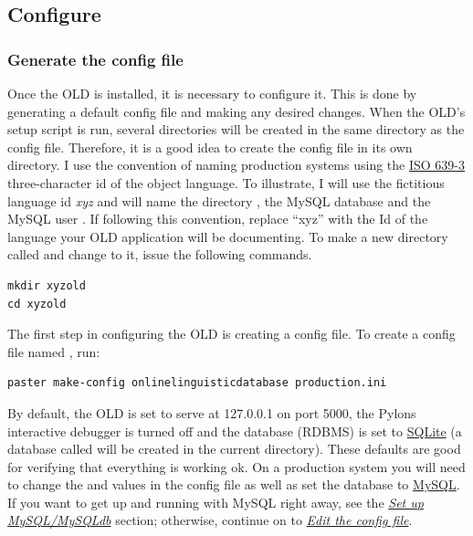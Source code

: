 \documentclass[letterpaper,10pt,english]{sphinxmanual}
\begin{document}
\subsection{Configure}
\label{installation:configure}

\subsubsection{Generate the config file}
\label{installation:generate-the-config-file}\label{installation:gen-config}
Once the OLD is installed, it is necessary to configure it.  This is done by
generating a default config file and making any desired changes.  When the OLD's
setup script is run, several directories will be created in the same directory
as the config file.  Therefore, it is a good idea to create the config file in
its own directory.  I use the convention of naming production systems using the
\href{http://www-01.sil.org/iso639-3/codes.asp}{ISO 639-3} three-character id of
the object language.  To illustrate, I will use the fictitious language id \emph{xyz}
and will name the directory , the MySQL database  and the
MySQL user .  If following this convention, replace ``xyz'' with the Id
of the language your OLD application will be documenting.  To make a new
directory called  and change to it, issue the following commands.

\begin{Verbatim}[commandchars=\\\{\}]
mkdir xyzold
cd xyzold
\end{Verbatim}

The first step in configuring the OLD is creating a config file.  To create a
config file named , run:

\begin{Verbatim}[commandchars=\\\{\}]
paster make-config onlinelinguisticdatabase production.ini
\end{Verbatim}

By default, the OLD is set to serve at 127.0.0.1 on port 5000, the Pylons
interactive debugger is turned off and the database (RDBMS) is set to
\href{http://www.sqlite.org/}{SQLite} (a database called  will be
created in the current directory). These defaults are good for verifying that
everything is working ok.  On a production system you will need to change the
 and  values in the config file as well as set the database to
\href{http://www.mysql.com/}{MySQL}. If you want to get up and running with MySQL
right away, see the {\hyperref[installation:mysql-config]{\emph{Set up MySQL/MySQLdb}}} section; otherwise, continue on to
{\hyperref[installation:edit-config]{\emph{Edit the config file}}}.
\end{document}
